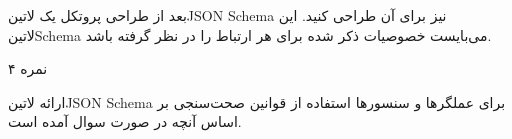 بعد از طراحی پروتکل یک ‌لاتین{JSON Schema} نیز برای آن طراحی کنید.
این ‌لاتین{Schema} می‌بایست خصوصیات ذکر شده برای هر ارتباط را در نظر گرفته باشد.


۴ نمره

\begin{پاسخ}

 ارائه ‌لاتین{JSON Schema} برای عملگرها و سنسورها
 استفاده از قوانین صحت‌سنجی بر اساس آنچه در صورت سوال آمده است.

\end{پاسخ}
